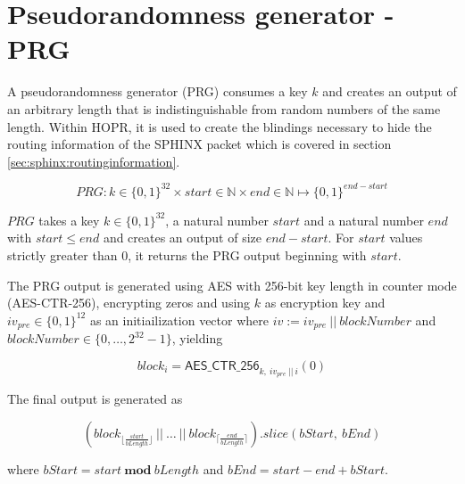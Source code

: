 \section{Pseudorandomness generator - PRG}
\label{appendix:prg}

A pseudorandomness generator (PRG) consumes a key $k$ and creates an output of an arbitrary length that is indistinguishable from random numbers of the same length. Within HOPR, it is used to create the blindings necessary to hide the routing information of the SPHINX packet which is covered in section \ref{sec:sphinx:routinginformation}.

$$ PRG : k \in \{ 0,1 \}^{32} \times start \in \mathbb{N} \times end \in \mathbb{N} \mapsto \{ 0,1 \}^{end - start} $$

$PRG$ takes a key $k \in \{ 0,1 \}^{32}$, a natural number $start$ and a natural number $end$ with $start \le end$ and creates an output of size $end - start$. For $start$ values strictly greater than $0$, it returns the PRG output beginning with $start$.

The PRG output is generated using AES with 256-bit key length in counter mode (AES-CTR-256), encrypting zeros and using $k$ as encryption key and $iv_{pre} \in \{ 0, 1 \}^{12}$ as an initiailization vector where $iv := iv_{pre} \ || \ blockNumber$ and $blockNumber \in \{ 0, \dots, 2^{32} - 1 \}$, yielding

$$ block_i = \mathsf{AES\_CTR\_256}_{k, \ iv_{pre} \ || \ i}(0) $$

The final output is generated as

$$ ( block_{\lfloor \frac{start}{bLength}\rfloor} \ || \ \dots \ || \ block_{\lceil \frac{end}{bLength}\rceil} ).slice(bStart, \ bEnd)$$

where $bStart=start \ \textbf{mod} \ bLength$ and $bEnd = start - end + bStart$.

